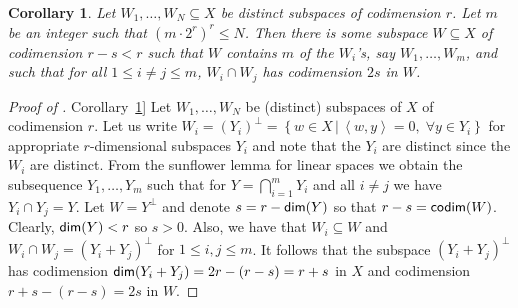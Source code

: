\documentclass[11pt]{article}
\numberwithin{equation}{section}
\newtheorem{corollary}[theorem]{Corollary}
\theoremstyle{definition}
\theoremstyle{plain}
\newcommand{\expref}[2]{\hyperref[#2]{#1~\ref{#2}}}
\newcommand\Set[2]{ \left\{ #1 \,  \vert  \, #2\right\} }
\newcommand*\dimm{{\sf dim}}
\newcommand*\codimm{{\sf codim}}
\renewcommand\leq{\leqslant}
\renewcommand\le{\leqslant}
\renewcommand\subset{\subseteq}
\begin{document}
\begin{corollary}\label{cor:sunflower}
  Let $W_1,\ldots,W_N\subset X$ be distinct subspaces of codimension
  $r$. Let $m$ be an integer such that $(m \cdot 2^r)^r \leq N$. Then
  there is some subspace $W\subset X$ of codimension
  $r-s<r$
  such
  that $W$ contains $m$ of the $W_i$'s, say $W_1,\ldots,W_m$, and such
  that for all $1\le i\neq j \le m$, $W_i\cap W_j$ has codimension
  $2s$ in $W$.
\end{corollary}
\begin{proof}[Proof of \expref{Corollary}{cor:sunflower}]
Let $W_1, \ldots, W_N$ be (distinct) subspaces of $X$ of codimension $r$. Let us write $W_i = (Y_i)^\perp = \Set{ w \in X }{ \left<w,y\right>=0,\; \forall y\in Y_i}$ for appropriate $r$-dimensional subspaces $Y_i$ and note that the $Y_i$ are distinct since the $W_i$ are distinct.
From the sunflower lemma for linear spaces we obtain the subsequence $Y_1,\dots,Y_m$ such that for
%
$Y=\bigcap_{i=1}^{m} Y_i$
and all $i\neq j$ we have $Y_i \cap Y_j = Y$.
Let $W = Y^\perp$ and denote $s = r-\dimm(Y)$ so that $r-s=\codimm(W)$.
%
Clearly, $\dimm(Y)<r$ so $s>0$.
Also, we have that $W_i \subset W$ and $W_i\cap W_j = (Y_i+Y_j)^\perp$ for $1\leq i,j\leq m$.
It follows that the subspace $(Y_i+Y_j)^\perp$ has codimension $\dimm(Y_i+Y_j) = 2r-(r-s) = r+s$ in $X$ and codimension $r+s - (r-s) = 2s$ in $W$.
\end{proof}
%
\end{document}
